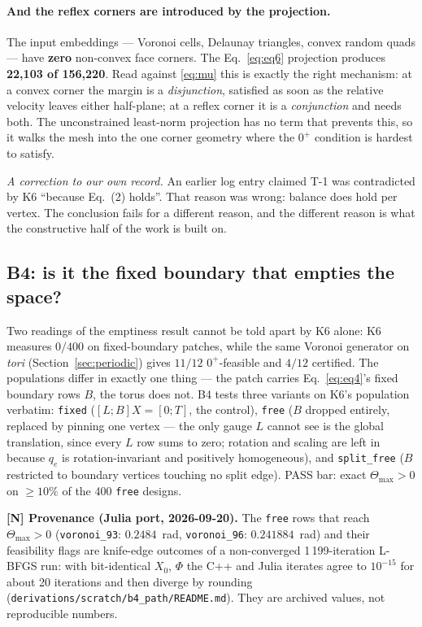 \documentclass[11pt,a4paper]{article}
\theoremstyle{definition}
\newcommand{\Tmax}{\Theta_{\max}}
\newcommand{\file}[1]{\texttt{\small #1}}
\begin{document}
\paragraph{And the reflex corners are introduced by the projection.} The input embeddings
--- Voronoi cells, Delaunay triangles, convex random quads --- have \textbf{zero} non-convex
face corners. The Eq.~\eqref{eq:eq6} projection produces \textbf{22{,}103 of 156{,}220}. Read
against \eqref{eq:mu} this is exactly the right mechanism: at a convex corner the margin is a
\emph{disjunction}, satisfied as soon as the relative velocity leaves either half-plane; at a
reflex corner it is a \emph{conjunction} and needs both. The unconstrained least-norm
projection has no term that prevents this, so it walks the mesh into the one corner geometry
where the $0^+$ condition is hardest to satisfy.

\emph{A correction to our own record.} An earlier log entry claimed T-1 was contradicted by
K6 ``because Eq.~(2) holds''. That reason was wrong: balance does hold per vertex. The
conclusion fails for a different reason, and the different reason is what the constructive
half of the work is built on.

\subsection{B4: is it the fixed boundary that empties the space?}

Two readings of the emptiness result cannot be told apart by K6 alone: K6 measures $0/400$ on
fixed-boundary patches, while the same Voronoi generator on \emph{tori}
(Section~\ref{sec:periodic}) gives $11/12$ $0^+$-feasible and $4/12$ certified. The
populations differ in exactly one thing --- the patch carries Eq.~\eqref{eq:eq4}'s fixed
boundary rows $B$, the torus does not. B4 tests three variants on K6's population verbatim:
\texttt{fixed} ($[L;B]X=[0;T]$, the control), \texttt{free} ($B$ dropped entirely, replaced by
pinning one vertex --- the only gauge $L$ cannot see is the global translation, since every
$L$ row sums to zero; rotation and scaling are left in because $q_e$ is rotation-invariant and
positively homogeneous), and \texttt{split\_free} ($B$ restricted to boundary vertices
touching no split edge). PASS bar: exact $\Tmax>0$ on $\ge10\%$ of the 400 \texttt{free}
designs.

\noindent\textbf{[N] Provenance (Julia port, 2026-09-20).} The \texttt{free} rows that reach
$\Tmax>0$ (\file{voronoi\_93}: $0.2484$~rad, \file{voronoi\_96}: $0.241884$~rad) and their
feasibility flags are knife-edge outcomes of a non-converged 1\,199-iteration L-BFGS run: with
bit-identical $X_0$, $\Phi$ the C++ and Julia iterates agree to $10^{-15}$ for about 20 iterations and
then diverge by rounding (\file{derivations/scratch/b4\_path/README.md}). They are archived values,
not reproducible numbers.
\end{document}
